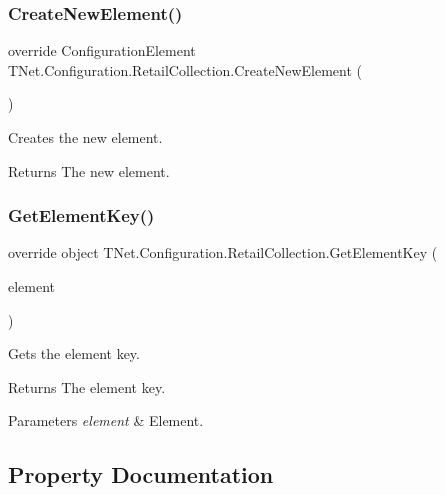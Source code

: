 \subsubsection{\texorpdfstring{Create\+New\+Element()}{CreateNewElement()}}
{\footnotesize\ttfamily override Configuration\+Element T\+Net.\+Configuration.\+Retail\+Collection.\+Create\+New\+Element (\begin{DoxyParamCaption}{ }\end{DoxyParamCaption})\hspace{0.3cm}{\ttfamily [protected]}}



Creates the new element. 

\begin{DoxyReturn}{Returns}
The new element.
\end{DoxyReturn}
\mbox{\label{class_t_net_1_1_configuration_1_1_retail_collection_a0951fe11e2aefcdc9c97b335a7d5910f}} 
\subsubsection{\texorpdfstring{Get\+Element\+Key()}{GetElementKey()}}
{\footnotesize\ttfamily override object T\+Net.\+Configuration.\+Retail\+Collection.\+Get\+Element\+Key (\begin{DoxyParamCaption}\item[{Configuration\+Element}]{element }\end{DoxyParamCaption})\hspace{0.3cm}{\ttfamily [protected]}}



Gets the element key. 

\begin{DoxyReturn}{Returns}
The element key.
\end{DoxyReturn}

\begin{DoxyParams}{Parameters}
{\em element} & Element.\\
\hline
\end{DoxyParams}


\subsection{Property Documentation}
\mbox{\label{class_t_net_1_1_configuration_1_1_retail_collection_afee6191f2ae49f7eeed547de9584b05d}} 
